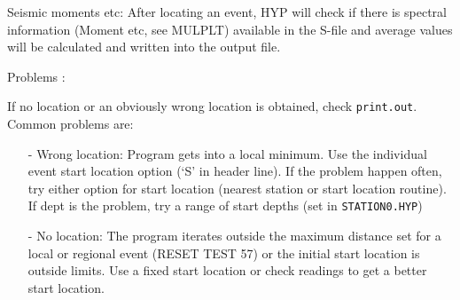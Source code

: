 Seismic moments etc: After locating an event, HYP will check if there is spectral information (Moment etc, see MULPLT) available in the S-file and average values will be calculated and written into the output file. 

Problems  :

If no location or an obviously wrong location is obtained, check \texttt{print.out}. Common problems are: 

\begin{itemize}
\item[-]
Wrong location: Program gets into a local minimum. Use the individual event start location option (`S' 
in header line). If the problem happen often, try either option for start location (nearest station or start 
location routine). If dept is the problem, try a range of start depths (set in \texttt{STATION0.HYP}) 
\item[-]
No location: The program iterates outside the maximum distance set for a local or regional event 
(RESET TEST 57) or the initial start location is outside limits. Use a fixed start location or check 
readings to get a better start location. 
\end{itemize}

